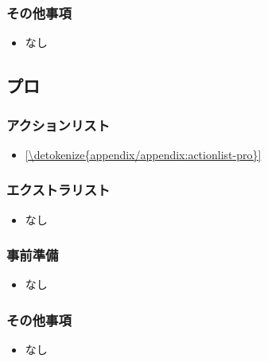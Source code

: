 \documentclass[letterpaper,10pt,dvipdfmx]{sphinxmanual}
\begin{document}
\subsubsection{その他事項}
\label{\detokenize{format/standard:id5}}\begin{itemize}
\item {} 
\sphinxAtStartPar
なし

\end{itemize}

\sphinxstepscope


\subsection{プロ}
\label{\detokenize{format/pro:format-pro}}\label{\detokenize{format/pro:id1}}\label{\detokenize{format/pro::doc}}

\subsubsection{アクションリスト}
\label{\detokenize{format/pro:id2}}\begin{itemize}
\item {} 
\sphinxAtStartPar
\hyperref[\detokenize{appendix/appendix:actionlist-pro}]{\ref{\detokenize{appendix/appendix:actionlist-pro}} }

\end{itemize}


\subsubsection{エクストラリスト}
\label{\detokenize{format/pro:id3}}\begin{itemize}
\item {} 
\sphinxAtStartPar
なし

\end{itemize}


\subsubsection{事前準備}
\label{\detokenize{format/pro:id4}}\begin{itemize}
\item {} 
\sphinxAtStartPar
なし

\end{itemize}


\subsubsection{その他事項}
\label{\detokenize{format/pro:id5}}\begin{itemize}
\item {} 
\sphinxAtStartPar
なし

\end{itemize}
\end{document}
